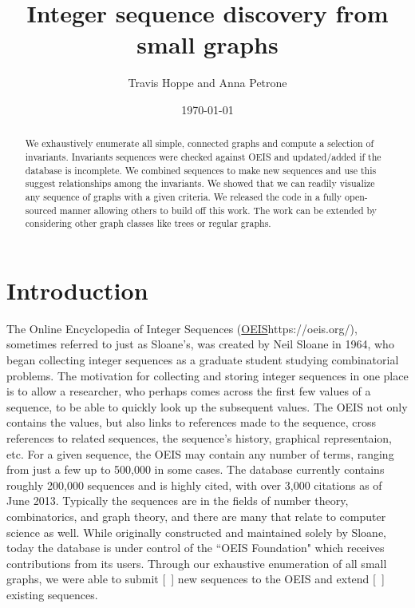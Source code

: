 \documentclass[12pt]{article}
\begin{document}
\setlength{\parindent}{0cm}

\title{Integer sequence discovery from small graphs}
\author{Travis Hoppe and Anna Petrone}
\date{\today}
\maketitle

\begin{abstract}
We exhaustively enumerate all simple, connected graphs and compute a selection of invariants. 
Invariants sequences were checked against OEIS and updated/added if the database is incomplete.
We combined sequences to make new sequences and use this suggest relationships among the invariants.
We showed that we can readily visualize any sequence of graphs with a given criteria.
We released the code in a fully open-sourced manner allowing others to build off this work.
The work can be extended by considering other graph classes like trees or regular graphs.
\end{abstract}

\section{Introduction}

The Online Encyclopedia of Integer Sequences (\url{OEIS}{https://oeis.org/}), sometimes referred to just as Sloane's, was created by Neil Sloane in 1964, who began collecting integer sequences as a graduate student studying combinatorial problems. The motivation for collecting and storing integer sequences in one place is to allow a researcher, who perhaps comes across the first few values of a sequence, to be able to quickly look up the subsequent values. The OEIS not only contains the values, but also links to references made to the sequence, cross references to related sequences, the sequence's history, graphical representaion, etc. For a given sequence, the OEIS may contain any number of terms, ranging from just a few up to 500,000 in some cases. The database currently contains roughly 200,000 sequences and is highly cited, with over 3,000 citations as of June 2013. Typically the sequences are in the fields of number theory, combinatorics, and graph theory, and there are many that relate to computer science as well. While originally constructed and maintained solely by Sloane, today the database is under control of the ``OEIS Foundation" which receives contributions from its users. Through our exhaustive enumeration of all small graphs, we were able to submit [\ ] new sequences to the OEIS and extend [\ ] existing sequences. \\
\end{document}
